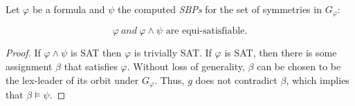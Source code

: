 
%
%

\begin{theorem}
 \label{theorem:satisfiability_preservation_SBPs}
 Let $\varphi$ be a formula and $\psi$ the computed \textit{SBPs} for the set of symmetries in $G_{\varphi}$:
 
 $$\varphi~and ~\varphi \wedge \psi \text{ are equi-satisfiable}.$$
\end{theorem}
\begin{proof}
 If $\varphi \wedge \psi$ is SAT then $\varphi$ is trivially SAT. If
 $\varphi$ is SAT, then there is some assignment $\beta$ that satisfies $\varphi$.
 Without loss of generality, $\beta$ can be chosen to be the lex-leader of its
 orbit under $G_{\varphi}$. Thus, $g$ does not contradict $\beta$, which implies that
 $\beta \models \psi$.
\end{proof}



